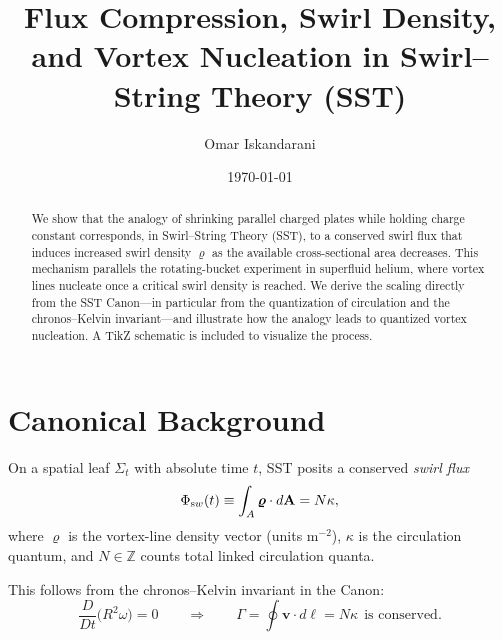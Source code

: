 \documentclass[11pt,a4paper]{article}
\title{Flux Compression, Swirl Density, and Vortex Nucleation in Swirl--String Theory (SST)}
\author{Omar Iskandarani}
\date{\today}
\begin{document}
\maketitle

\begin{abstract}
We show that the analogy of shrinking parallel charged plates while holding charge constant corresponds, in Swirl--String Theory (SST), to a conserved swirl flux that induces increased swirl density $\bm{\varrho}$ as the available cross-sectional area decreases. This mechanism parallels the rotating-bucket experiment in superfluid helium, where vortex lines nucleate once a critical swirl density is reached. We derive the scaling directly from the SST Canon---in particular from the quantization of circulation and the chronos--Kelvin invariant---and illustrate how the analogy leads to quantized vortex nucleation. A TikZ schematic is included to visualize the process.
\end{abstract}

\section{Canonical Background}
    On a spatial leaf $\Sigma_t$ with absolute time $t$, SST posits a conserved \emph{swirl flux}
    \begin{equation}
    \Phi_{\textrm sw}(t) \equiv \int_A \bm{\varrho}\cdot d\mathbf A = N\kappa,
    \end{equation}
    where $\bm{\varrho}$ is the vortex-line density vector (units m$^{-2}$), $\kappa$ is the circulation quantum, and $N\in\mathbb{Z}$ counts total linked circulation quanta.

    This follows from the chronos--Kelvin invariant in the Canon:
    \begin{equation}
    \frac{D}{Dt} \Big( R^2 \omega \Big) = 0 \qquad \Rightarrow \qquad \Gamma = \oint \mathbf v \cdot d\boldsymbol\ell = N\kappa \ \ \text{is conserved}.
    \end{equation}
\end{document}
